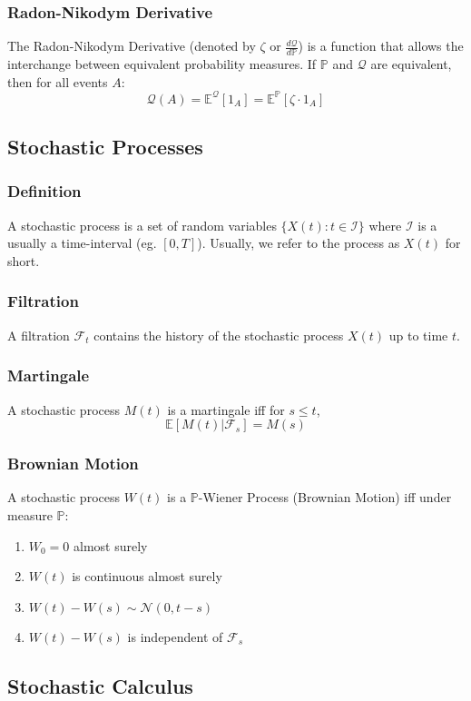 \documentclass[11pt]{article}
\newcommand{\E}{\mathbb{E}}
\newcommand{\PR}{\mathbb{P}}
\newcommand{\Q}{\mathcal{Q}}
\begin{document}
	\subsubsection{Radon-Nikodym Derivative}
	The Radon-Nikodym Derivative (denoted by \( \zeta \) or \( \frac{d\Q}{d\PR} \)) is a function that allows the interchange between equivalent probability measures. If \( \PR \) and \( \Q \) are equivalent, then for all events \( A \):
	\[	\Q(A) = \E^{\Q}[1_{A}] = \E^{\PR}\left[\zeta\cdot 1_{A}\right]
		\]
	\subsection{Stochastic Processes}
	\subsubsection{Definition}
	A stochastic process is a set of random variables \( \{X(t) : t\in \mathcal{I}\} \) where \( \mathcal{I} \) is a usually a time-interval (eg. \( [0, T] \)). Usually, we refer to the process as \( X(t) \) for short.
	\subsubsection{Filtration}
	A filtration \( \mathcal{F}_t \) contains the history of the stochastic process \( X(t) \) up to time \( t \).
	\subsubsection{Martingale}
	A stochastic process \( M(t) \) is a martingale iff for \( s\leq t \),
	\[	\E[M(t) | \mathcal{F}_s] = M(s)\]
	\subsubsection{Brownian Motion}
	A stochastic process \( W(t) \) is a \( \PR \)-Wiener Process (Brownian Motion) iff under measure \( \PR \):
	\begin{enumerate}
		\item \( W_0 = 0 \) almost surely
		\item \( W(t) \) is continuous almost surely
		\item \( W(t) - W(s) \sim\mathcal{N}(0, t-s) \)
		\item \( W(t) - W(s) \) is independent of \( \mathcal{F}_s \)
	\end{enumerate}
	\subsection{Stochastic Calculus} 
\end{document}
